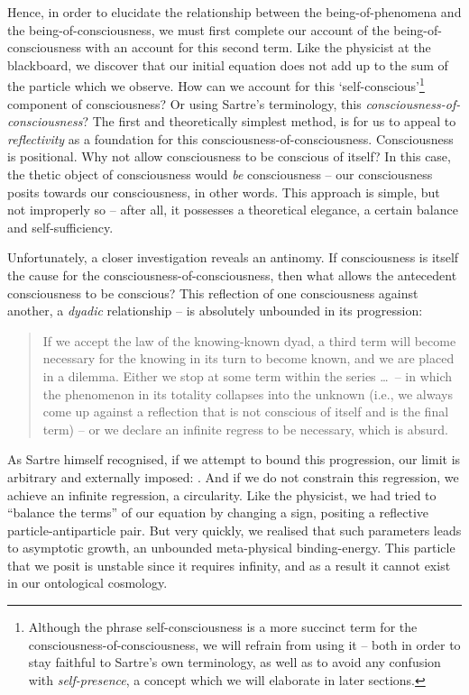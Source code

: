\noindent
Hence, in order to elucidate the relationship between the being-of-phenomena and the being-of-consciousness, we must first complete our account of the being-of-consciousness with an account for this second term. Like the physicist at the blackboard, we discover that our initial equation does not add up to the sum of the particle which we observe. How can we account for this \enquote*{self-conscious}\footnote{Although the phrase self-consciousness is a more succinct term for the consciousness-of-consciousness, we will refrain from using it -- both in order to stay faithful to Sartre's own terminology, as well as to avoid any confusion with \emph{self-presence}, a concept which we will elaborate in later sections.} component of consciousness? Or using Sartre's terminology, this \emph{consciousness-of-consciousness}? The first and theoretically simplest method, is for us to appeal to \emph{reflectivity} as a foundation for this consciousness-of-consciousness. Consciousness is positional. Why not allow consciousness to be conscious of itself? In this case, the thetic object of consciousness would \emph{be} consciousness -- our consciousness posits towards our consciousness, in other words. This approach is simple, but not improperly so -- after all, it possesses a theoretical elegance, a certain balance and self-sufficiency.

Unfortunately, a closer investigation reveals an antinomy. If consciousness is itself the cause for the consciousness-of-consciousness, then what allows the antecedent consciousness to be conscious? This reflection of one consciousness against another, a \emph{dyadic} relationship -- is absolutely unbounded in its progression:

\blockcquote[11]{Sartre}{
    If we accept the law of the knowing-known dyad, a third term will become necessary for the knowing in its turn to become known, and we are placed in a dilemma. Either we stop at some term within the series \ldots\ -- in which the phenomenon in its totality collapses into the unknown (i.e., we always come up against a reflection that is not conscious of itself and is the final term) -- or we declare an infinite regress to be necessary, which is absurd.
}

\noindent
As Sartre himself recognised, if we attempt to bound this progression, our limit is arbitrary and externally imposed: . And if we do not constrain this regression, we achieve an infinite regression, a circularity. Like the physicist, we had tried to \enquote{balance the terms} of our equation by changing a sign, positing a reflective particle-antiparticle pair. But very quickly, we realised that such parameters leads to asymptotic growth, an unbounded meta-physical binding-energy. This particle that we posit is unstable since it requires infinity, and as a result it cannot exist in our ontological cosmology.

